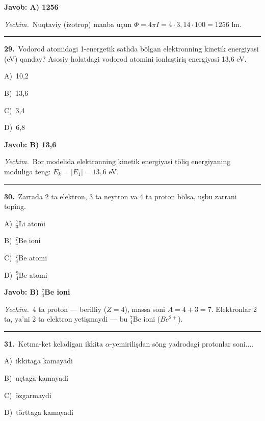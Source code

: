 \documentclass[11pt,a4paper]{article}
\newcommand{\opt}[2]{\hspace*{4mm}#1)\ #2\par}
\begin{document}
\noindent\colorbox{gray!12}{\parbox{\dimexpr\linewidth-2\fboxsep}{\textbf{Javob: A) 1256}}}\par\smallskip
\noindent\textit{Yechim.}\ Nuqtaviy (izotrop) manba uçun $\Phi=4\pi I=4\cdot3{,}14\cdot100=1256$ lm.\par\par\medskip\hrule\medskip
{}\noindent\begin{minipage}{\linewidth}
\textbf{29.}\ Vodorod atomidagi 1-energetik sathda bölgan elektronning kinetik energiyasi (eV) qanday? Asosiy holatdagi vodorod atomini ionlaştiriş energiyasi 13,6 eV.\par\smallskip
\opt{A}{10,2}
\opt{B}{13,6}
\opt{C}{3,4}
\opt{D}{6,8}
\end{minipage}\vspace{2pt}\par
\noindent\colorbox{gray!12}{\parbox{\dimexpr\linewidth-2\fboxsep}{\textbf{Javob: B) 13,6}}}\par\smallskip
\noindent\textit{Yechim.}\ Bor modelida elektronning kinetik energiyasi töliq energiyaning moduliga teng: $E_k=|E_1|=13{,}6$ eV.\par\par\medskip\hrule\medskip
{}\noindent\begin{minipage}{\linewidth}
\textbf{30.}\ Zarrada 2 ta elektron, 3 ta neytron va 4 ta proton bölsa, uşbu zarrani toping.\par\smallskip
\opt{A}{$^{7}_{3}$Li atomi}
\opt{B}{$^{7}_{4}$Be ioni}
\opt{C}{$^{7}_{4}$Be atomi}
\opt{D}{$^{9}_{4}$Be atomi}
\end{minipage}\vspace{2pt}\par
\noindent\colorbox{gray!12}{\parbox{\dimexpr\linewidth-2\fboxsep}{\textbf{Javob: B) $^{7}_{4}$Be ioni}}}\par\smallskip
\noindent\textit{Yechim.}\ 4 ta proton — berilliy ($Z=4$), massa soni $A=4+3=7$. Elektronlar 2 ta, ya’ni 2 ta elektron yetişmaydi — bu $^7_4$Be ioni ($Be^{2+}$).\par\par\medskip\hrule\medskip
{}\noindent\begin{minipage}{\linewidth}
\textbf{31.}\ Ketma-ket keladigan ikkita $\alpha$-yemirilişdan söng yadrodagi protonlar soni....\par\smallskip
\opt{A}{ikkitaga kamayadi}
\opt{B}{uçtaga kamayadi}
\opt{C}{özgarmaydi}
\opt{D}{törttaga kamayadi}
\end{minipage}\vspace{2pt}\par
\end{document}
